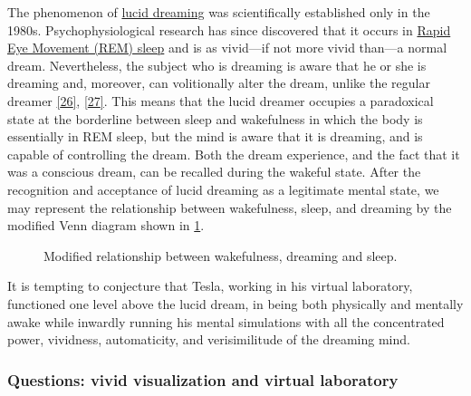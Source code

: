 \documentclass[
  a4paper,
]{article}
\begin{document}
The phenomenon of \href{https://en.wikipedia.org/wiki/Lucid_dream}{lucid
dreaming} was scientifically established only in the 1980s.
Psychophysiological research has since discovered that it occurs in
\href{https://en.wikipedia.org/wiki/Rapid_eye_movement_sleep}{Rapid Eye
Movement (REM) sleep} and is as vivid---if not more vivid than---a
normal dream. Nevertheless, the subject who is dreaming is aware that he
or she is dreaming and, moreover, can volitionally alter the dream,
unlike the regular dreamer \protect\hyperlink{ref-laberge85}{{[}26{]}},
\protect\hyperlink{ref-laberge2000}{{[}27{]}}. This means that the lucid
dreamer occupies a paradoxical state at the borderline between sleep and
wakefulness in which the body is essentially in REM sleep, but the mind
is aware that it is dreaming, and is capable of controlling the dream.
Both the dream experience, and the fact that it was a conscious dream,
can be recalled during the wakeful state. After the recognition and
acceptance of lucid dreaming as a legitimate mental state, we may
represent the relationship between wakefulness, sleep, and dreaming by
the modified Venn diagram shown in \cref{fig:lucid}.

\begin{figure}
\hypertarget{fig:lucid}{%
\centering

\caption[Modified relationship between wakefulness, dreaming and
sleep.]{Modified relationship between wakefulness, dreaming and
sleep.\footnotemark{}}\label{fig:lucid}
}
\end{figure}

It is tempting to conjecture that Tesla, working in his virtual
laboratory, functioned one level above the lucid dream, in being both
physically and mentally awake while inwardly running his mental
simulations with all the concentrated power, vividness, automaticity,
and verisimilitude of the dreaming mind.

\hypertarget{questions-vivid-visualization-and-virtual-laboratory}{%
\subsubsection{Questions: vivid visualization and virtual
laboratory}\label{questions-vivid-visualization-and-virtual-laboratory}}
\end{document}
